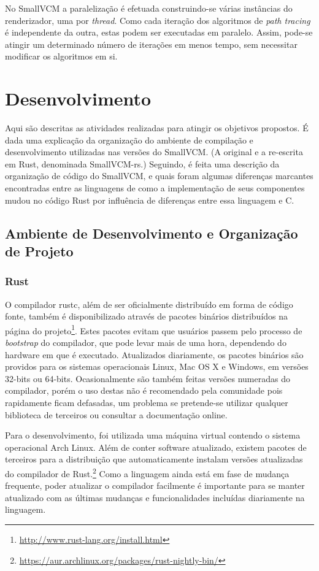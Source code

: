 \documentclass[tg]{mdtufsm}
\def\Cpp{{C\nolinebreak[4]\raisebox{.20ex}{\small\bf++}}}
\begin{document}
No SmallVCM a paralelização é efetuada construindo-se várias instâncias do renderizador, uma por \emph{thread}. Como cada iteração dos algoritmos de \emph{path tracing} é independente da outra, estas podem ser executadas em paralelo. Assim, pode-se atingir um determinado número de iterações em menos tempo, sem necessitar modificar os algoritmos em si.

\chapter{Desenvolvimento}

Aqui são descritas as atividades realizadas para atingir os objetivos propostos. É dada uma explicação da organização do ambiente de compilação e desenvolvimento utilizadas nas versões do SmallVCM. (A original e a re-escrita em Rust, denominada SmallVCM-rs.) Seguindo, é feita uma descrição da organização de código do SmallVCM, e quais foram algumas diferenças marcantes encontradas entre as linguagens de como a implementação de seus componentes mudou no código Rust por influência de diferenças entre essa linguagem e \Cpp.

\section{Ambiente de Desenvolvimento e Organização de Projeto}

\subsection{Rust}

O compilador rustc, além de ser oficialmente distribuído em forma de código fonte, também é disponibilizado através de pacotes binários distribuídos na página do projeto\footnote{\url{http://www.rust-lang.org/install.html}}. Estes pacotes evitam que usuários passem pelo processo de \emph{bootstrap} do compilador, que pode levar mais de uma hora, dependendo do hardware em que é executado. Atualizados diariamente, os pacotes binários são providos para os sistemas operacionais Linux, Mac OS X e Windows, em versões 32-bits ou 64-bits. Ocasionalmente são também feitas versões numeradas do compilador, porém o uso destas não é recomendado pela comunidade pois rapidamente ficam defasadas, um problema se pretende-se utilizar qualquer biblioteca de terceiros ou consultar a documentação online.

Para o desenvolvimento, foi utilizada uma máquina virtual contendo o sistema operacional Arch Linux. Além de conter software atualizado, existem pacotes de terceiros para a distribuição que automaticamente instalam versões atualizadas do compilador de Rust.\footnote{\url{https://aur.archlinux.org/packages/rust-nightly-bin/}} Como a linguagem ainda está em fase de mudança frequente, poder atualizar o compilador facilmente é importante para se manter atualizado com as últimas mudanças e funcionalidades incluídas diariamente na linguagem.
\end{document}
